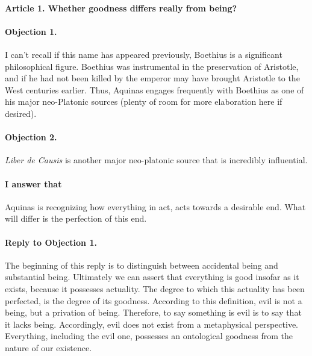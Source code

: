 \documentclass{ucetd}
\begin{document}
\begin{enumerate}
\end{enumerate}
\paragraph{Article 1. Whether goodness differs really from being?}

\paragraph{Objection 1.}
I can't recall if this name has appeared previously, Boethius is a significant philosophical figure. Boethius was instrumental in the preservation of Aristotle, and if he had not been killed by the emperor may have brought Aristotle to the West centuries earlier. Thus, Aquinas engages frequently with Boethius as one of his major neo-Platonic sources (plenty of room for more elaboration here if desired).
\paragraph{Objection 2.}
\textit{Liber de Causis} is another major neo-platonic source that is incredibly influential.
\paragraph{I answer that}
Aquinas is recognizing how everything in act, acts towards a desirable end. What will differ is the perfection of this end.
\paragraph{Reply to Objection 1.}
The beginning of this reply is to distinguish between accidental being and substantial being. Ultimately we can assert that everything is good insofar as it exists, because it possesses actuality. The degree to which this actuality has been perfected, is the degree of its goodness. According to this definition, evil is not a being, but a privation of being. Therefore, to say something is evil is to say that it lacks being. Accordingly, evil does not exist from a metaphysical perspective. Everything, including the evil one, possesses an ontological goodness from the nature of our existence.
\end{document}
